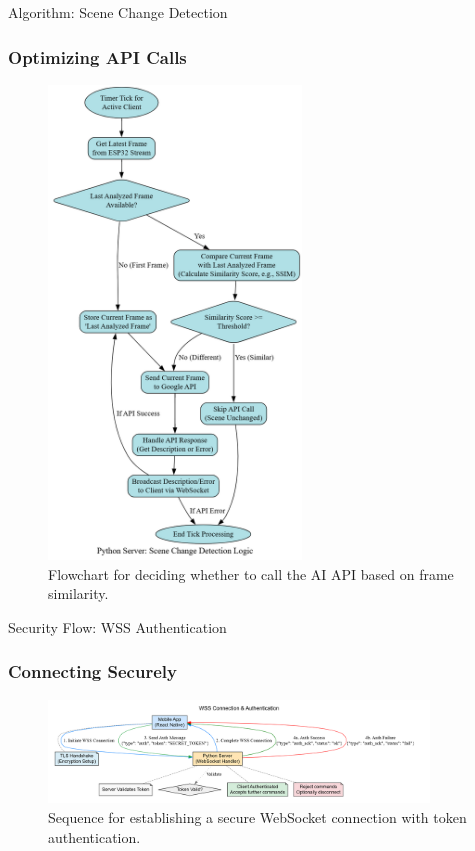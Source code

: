 \documentclass{beamer}
\begin{document}
\begin{frame}{Algorithm: Scene Change Detection}
    \frametitle{Optimizing API Calls}
     \begin{figure}
        \centering
        \includegraphics[height=0.8\textheight, width=0.6\textwidth, keepaspectratio]{Scene_Change_Detection_Logic_Flowchart.png} %
        \caption{Flowchart for deciding whether to call the AI API based on frame similarity.}
    \end{figure}
\end{frame}



\begin{frame}{Security Flow: WSS Authentication}
  \frametitle{Connecting Securely}
   \begin{figure}
      \centering
      \includegraphics[width=0.9\textwidth, height=0.7\textheight, keepaspectratio]{Security_Flow_Diagram.png}
      \caption{Sequence for establishing a secure WebSocket connection with token authentication.}
  \end{figure}
\end{frame}
\end{document}
